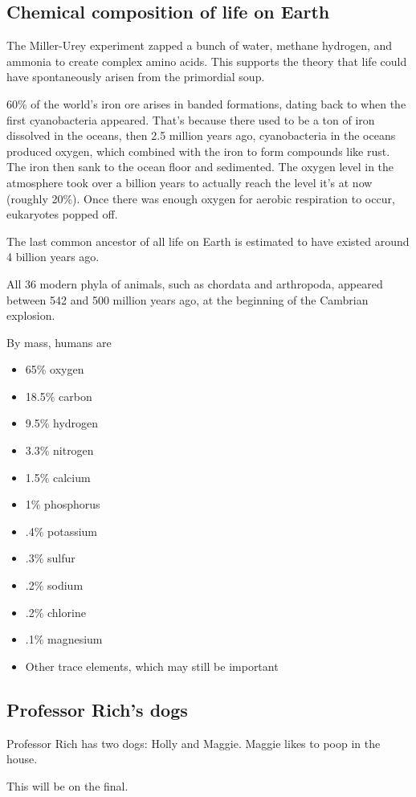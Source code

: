 \documentclass[class=article, crop=false]{standalone}
\begin{document}
\subsection{Chemical composition of life on Earth}
The Miller-Urey experiment zapped a bunch of water, methane hydrogen, and ammonia to create complex amino acids. This supports the theory that life could have spontaneously arisen from the primordial soup.
\par
60\% of the world's iron ore arises in banded formations, dating back to when the first cyanobacteria appeared. That's because there used to be a ton of iron dissolved in the oceans, then 2.5 million years ago, cyanobacteria in the oceans produced oxygen, which combined with the iron to form compounds like rust. The iron then sank to the ocean floor and sedimented. The oxygen level in the atmosphere took over a billion years to actually reach the level it's at now (roughly 20\%). Once there was enough oxygen for aerobic respiration to occur, eukaryotes popped off.
\par
The last common ancestor of all life on Earth is estimated to have existed around 4 billion years ago.
\par
All 36 modern phyla of animals, such as chordata and arthropoda, appeared between 542 and 500 million years ago, at the beginning of the Cambrian explosion.
\par
By mass, humans are
\begin{itemize}
    \item 65\% oxygen
    \item 18.5\% carbon
    \item 9.5\% hydrogen
    \item 3.3\% nitrogen
    \item 1.5\% calcium
    \item 1\% phosphorus
    \item .4\% potassium
    \item .3\% sulfur
    \item .2\% sodium
    \item .2\% chlorine
    \item .1\% magnesium
    \item Other trace elements, which may still be important
\end{itemize}
\subsection{Professor Rich's dogs}
Professor Rich has two dogs: Holly and Maggie. Maggie likes to poop in the house.
\par
This will be on the final.
\end{document}
